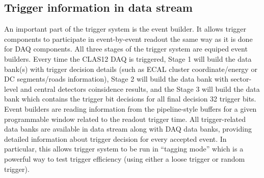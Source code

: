 \subsection{Trigger information in data stream}
\label{sec:trigger_in_datastream}

An important part of the trigger system is the event builder. It allows trigger components to participate in event-by-event readout the same way as it is done for DAQ components. All three stages of the trigger system are equiped  event builders. Every time the CLAS12 DAQ is triggered, Stage 1 will build the data bank(s) with trigger decision details (such as ECAL cluster coordinate/energy or DC segments/roads information), Stage 2 will build the data bank with sector-level and central detectors coinsidence results, and the Stage 3 will build the data bank which contains the trigger bit decisions for all final decision 32 trigger bits. Event builders are reading information from the pipeline-style buffers for a given programmable window related to the readout trigger time. All trigger-related data banks are available in data stream along with DAQ data banks, providing detailed information about trigger decision for every accepted event. In particular, this allows trigger system to be run in ``tagging mode'' which is a powerful way to test trigger efficiency (using either a loose trigger or random trigger).
